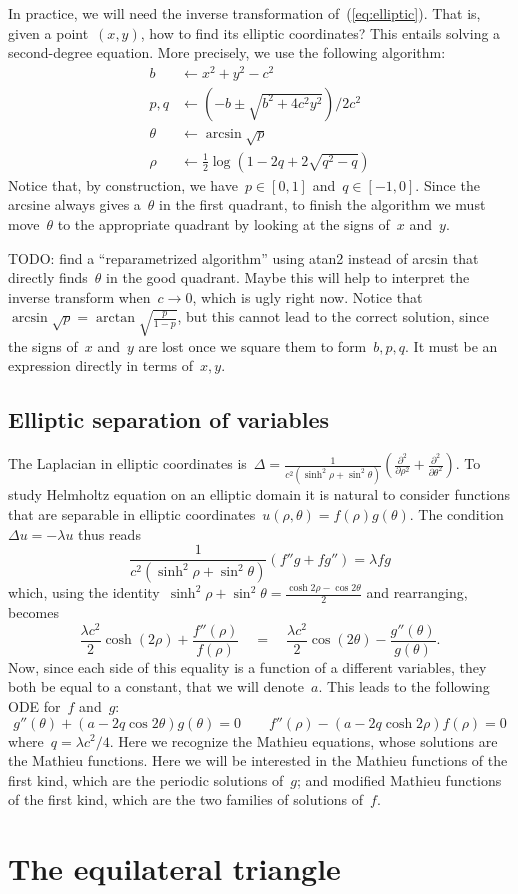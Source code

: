 In practice, we will need the inverse transformation
of~(\ref{eq:elliptic}).  That is, given a point~$(x,y)$, how to
find its elliptic coordinates?  This entails solving a second-degree
equation.  More precisely, we use the following algorithm:
\begin{align*}
	b   & \leftarrow x^2+y^2-c^2 \\
	p,q & \leftarrow \left(-b\pm\sqrt{b^2+4c^2y^2}\right)/{2c^2} \\
	\theta & \leftarrow \arcsin\sqrt{p} \\
	\rho & \leftarrow  \frac12\log\left(1-2q+2\sqrt{q^2-q}\right)
\end{align*}
Notice that, by construction, we have~$p\in[0,1]$ and~$q\in[-1,0]$.
Since the arcsine
always gives a~$\theta$ in the first quadrant, to finish the
algorithm we must move~$\theta$ to the appropriate quadrant by
looking at the signs of~$x$ and~$y$.

TODO: find a ``reparametrized algorithm'' using atan2 instead of
arcsin that directly finds~$\theta$ in the good quadrant.  Maybe this
will help to interpret the inverse transform when~$c\to0$, which is
ugly right now.  Notice that~$\arcsin\sqrt
p=\arctan\sqrt{\frac{p}{1-p}}$, but this cannot lead to the correct
solution, since the signs of~$x$ and~$y$ are lost once we square
them to form~$b,p,q$.  It must be an expression directly in terms
of~$x,y$.

\subsection{Elliptic separation of variables}

The Laplacian in elliptic coordinates
is~$\displaystyle\Delta=
\frac1{c^2\left(\sinh^2\rho+\sin^2\theta\right)}
\left(
	\frac{\partial^2}{\partial\rho^2}
	+
	\frac{\partial^2}{\partial\theta^2}
\right)
$.
To study Helmholtz equation on an elliptic domain it is natural to
consider functions that are separable in elliptic
coordinates~$u(\rho,\theta)=f(\rho)g(\theta)$.  The condition~$\Delta
u=-\lambda u$ thus reads
\[
\frac1{c^2\left(\sinh^2\rho+\sin^2\theta\right)}
\left(f''g+fg''\right)
=\lambda fg
\]
which, using the
identity~$\sinh^2\rho+\sin^2\theta=\frac{\cosh{2\rho}-\cos{2\theta}}2$
and
rearranging, becomes
\[
	\frac{\lambda c^2}2\cosh(2\rho)
	+
	\frac{f''(\rho)}{f(\rho)}
	\quad = \quad
	\frac{\lambda c^2}2\cos(2\theta)
	-\frac{g''(\theta)}{g(\theta)}.
\]
Now,
since each side of this equality is a function of a different
variables, they both be equal to a constant, that we will denote~$a$.
This leads to the following ODE for~$f$ and~$g$:
\begin{equation}\label{eq:mathieuell}
	g''(\theta)+\left(a-2q\cos2\theta\right)g(\theta)=0
	\qquad
	f''(\rho)-\left(a-2q\cosh2\rho\right)f(\rho)=0
\end{equation}
where~$q=\lambda c^2/4$.  Here we recognize the Mathieu
equations, whose solutions are the Mathieu functions.  Here we will
be interested in the Mathieu functions of the first kind, which are
the periodic solutions of~$g$; and modified Mathieu functions of the
first kind, which are the two families of solutions of~$f$.



\section{The equilateral triangle}

